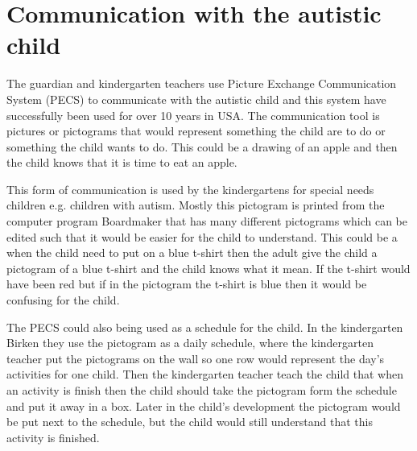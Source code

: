 \section{Communication with the autistic child}
The guardian and kindergarten teachers use Picture Exchange Communication System (PECS) to communicate with the autistic child and this system have successfully been used for over 10 years in USA. The communication tool is pictures or pictograms that would represent something the child are to do or something the child wants to do. This could be a drawing of an apple and then the child knows that it is time to eat an apple. 

This form of communication is used by the kindergartens for special needs children e.g. children with autism. Mostly this pictogram is printed from the computer program Boardmaker that has many different pictograms which can be edited such that it would be easier for the child to understand. This could be a when the child need to put on a blue t-shirt then the adult give the child a pictogram of a blue t-shirt and the child knows what it mean. If the t-shirt would have been red but if in the pictogram the t-shirt is blue then it would be confusing for the child. 

The PECS could also being used as a schedule for the child. In the kindergarten Birken they use the pictogram as a daily schedule, where the kindergarten teacher put the pictograms on the wall so one row would represent the day's activities for one child. Then the kindergarten teacher teach the child that when an activity is finish then the child should take the pictogram form the schedule and put it away in a box. Later in the child's development the pictogram would be put next to the schedule, but the child would still understand that this activity is finished. 